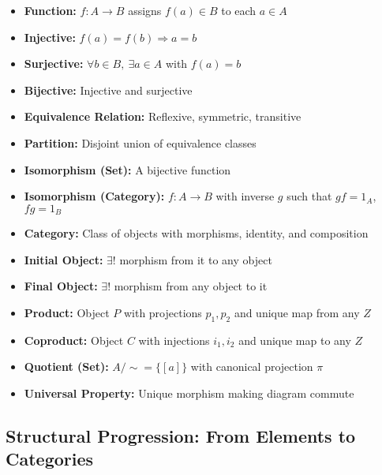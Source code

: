 \documentclass[10pt]{article}
\theoremstyle{plain}
\theoremstyle{definition}
\begin{document}
  \begin{itemize}
  	\item \textbf{Function:} $f: A \to B$ assigns $f(a) \in B$ to each $a \in A$
  	\item \textbf{Injective:} $f(a) = f(b) \Rightarrow a = b$
  	\item \textbf{Surjective:} $\forall b \in B,\ \exists a \in A$ with $f(a) = b$
  	\item \textbf{Bijective:} Injective and surjective
  	\item \textbf{Equivalence Relation:} Reflexive, symmetric, transitive
  	\item \textbf{Partition:} Disjoint union of equivalence classes
  	\item \textbf{Isomorphism (Set):} A bijective function
  	\item \textbf{Isomorphism (Category):} $f: A \to B$ with inverse $g$ such that $gf = 1_A$, $fg = 1_B$
  	\item \textbf{Category:} Class of objects with morphisms, identity, and composition
  	\item \textbf{Initial Object:} $\exists!$ morphism from it to any object
  	\item \textbf{Final Object:} $\exists!$ morphism from any object to it
  	\item \textbf{Product:} Object $P$ with projections $p_1, p_2$ and unique map from any $Z$
  	\item \textbf{Coproduct:} Object $C$ with injections $i_1, i_2$ and unique map to any $Z$
  	\item \textbf{Quotient (Set):} $A/{\sim} = \{ [a] \}$ with canonical projection $\pi$
  	\item \textbf{Universal Property:} Unique morphism making diagram commute
  \end{itemize}
  
  
  \subsection*{Structural Progression: From Elements to Categories}
  
\end{document}

